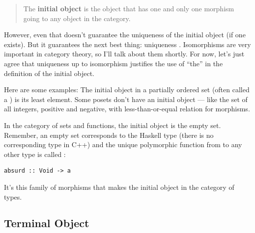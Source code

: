 \begin{quote}
The \textbf{initial object} is the object that has one and only one
morphism going to any object in the category.
\end{quote}

\begin{figure}
  \centering
\end{figure}

However, even that doesn't guarantee the uniqueness of the initial
object (if one exists). But it guarantees the next best thing:
uniqueness . Isomorphisms are very important in
category theory, so I'll talk about them shortly. For now, let's just
agree that uniqueness up to isomorphism justifies the use of ``the'' in
the definition of the initial object.

Here are some examples: The initial object in a partially ordered set
(often called a ) is its least element. Some posets don't
have an initial object --- like the set of all integers, positive and
negative, with less-than-or-equal relation for morphisms.

In the category of sets and functions, the initial object is the empty
set. Remember, an empty set corresponds to the Haskell type
 (there is no corresponding type in C++) and the unique
polymorphic function from  to any other type is called
:

\begin{verbatim}
absurd :: Void -> a
\end{verbatim}

It's this family of morphisms that makes  the initial
object in the category of types.

\subsection{Terminal Object}\label{terminal-object}

